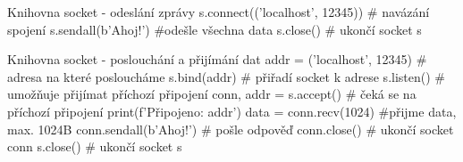 \documentclass{beamer}
\begin{document}
\begin{frame}{Knihovna socket - odeslání zprávy}
	s.connect(('localhost', 12345)) # navázání spojení
	s.sendall(b'Ahoj!') #odešle všechna data
	s.close() # ukončí socket s
\end{frame}

\begin{frame}{Knihovna socket - poslouchání  a přijímání dat}
	addr = ('localhost', 12345) # adresa na které posloucháme
	s.bind(addr) # přiřadí socket k adrese
	s.listen() # umožňuje přijímat příchozí připojení
	conn, addr = s.accept() # čeká se na příchozí připojení
	print(f'Připojeno: {addr}')
	data = conn.recv(1024) #přijme data, max. 1024B
	conn.sendall(b'Ahoj!') # pošle odpověď
	conn.close() # ukončí socket conn
	s.close() # ukončí socket s
\end{frame}
\end{document}
